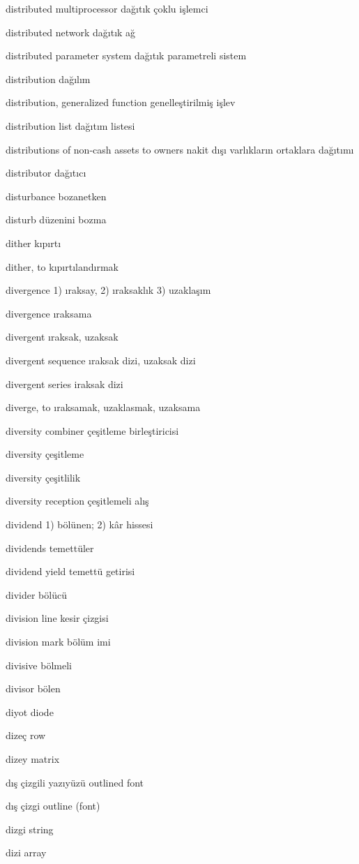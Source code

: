 \documentclass[12pt,fleqn]{article}\usepackage{../../common}
\begin{document}
distributed multiprocessor dağıtık çoklu işlemci

distributed network dağıtık ağ

distributed parameter system dağıtık parametreli sistem

distribution dağılım

distribution, generalized function genelleştirilmiş işlev

distribution list dağıtım listesi

distributions of non-cash assets to owners nakit dışı varlıkların ortaklara dağıtımı

distributor dağıtıcı

disturbance bozanetken

disturb düzenini bozma

dither kıpırtı

dither, to kıpırtılandırmak

divergence 1) ıraksay, 2) ıraksaklık 3) uzaklaşım

divergence ıraksama

divergent ıraksak, uzaksak

divergent sequence ıraksak dizi, uzaksak dizi

divergent series iraksak dizi

diverge, to ıraksamak, uzaklasmak, uzaksama

diversity combiner çeşitleme birleştiricisi

diversity çeşitleme

diversity çeşitlilik

diversity reception çeşitlemeli alış

dividend 1) bölünen; 2) kâr hissesi

dividends temettüler

dividend yield temettü getirisi

divider bölücü

division line kesir çizgisi

division mark bölüm imi

divisive bölmeli

divisor bölen

diyot diode

dizeç row

dizey matrix

dış çizgili yazıyüzü outlined font

dış çizgi outline (font)

dizgi string

dizi array
\end{document}
